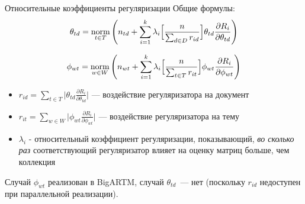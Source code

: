 \begin{frame}{Относительные коэффициенты регуляризации}
Общие формулы:
\[
\theta_{td} = \mathop{\mathrm{norm}}\limits_{t \in T} \Bigg(
    n_{td} + \sum_{i=1}^k \lambda_i \Big[
        \frac{n}{\sum_{d\in D} r_{id}}
        \Big]
    \theta_{td} \frac{\partial R_i}{\partial \theta_{td}}
\Bigg)
\]


\[
\phi_{wt} = \mathop{\mathrm{norm}}\limits_{w \in W}\Bigg(
    n_{wt} + \sum_{i=1}^k \lambda_i \Big[
        \frac{n}{\sum_{t\in T} r_{it}}
        \Big]
    \phi_{wt} \frac{\partial R_i}{\partial \phi_{wt}}
\Bigg)
\]

\small
\begin{itemize}
    \item { $r_{id} = \sum_{t\in T} \Big | \theta_{td} \frac{\partial R_i}{\partial \theta_{td}} \Big | $ --- воздействие регуляризатора на документ}

    \item{$r_{it} = \sum_{w\in W} \Big| \phi_{wt} \frac{\partial R_i}{\partial \phi_{wt}} \Big| $ --- воздействие регуляризатора на тему}
	\item { $\lambda_i$ - относительный коэффициент регуляризации, показывающий, \emph{во сколько раз} соответствующий регуляризатор влияет на оценку матриц больше, чем коллекция}
\end{itemize}

Случай $\phi_{wt}$ реализован в BigARTM, случай $\theta_{td}$~--- нет (поскольку $r_{id}$ недоступен при параллельной реализации).

\end{frame}

